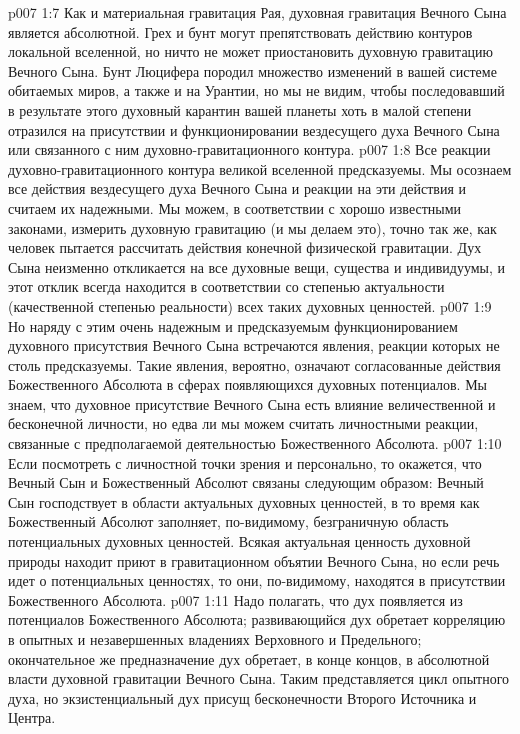 \vs p007 1:7 \pc Как и материальная гравитация Рая, духовная гравитация Вечного Сына является абсолютной. Грех и бунт могут препятствовать действию контуров локальной вселенной, но ничто не может приостановить духовную гравитацию Вечного Сына. Бунт Люцифера породил множество изменений в вашей системе обитаемых миров, а также и на Урантии, но мы не видим, чтобы последовавший в результате этого духовный карантин вашей планеты хоть в малой степени отразился на присутствии и функционировании вездесущего духа Вечного Сына или связанного с ним духовно\hyp{}гравитационного контура.
\vs p007 1:8 \pc Все реакции духовно\hyp{}гравитационного контура великой вселенной предсказуемы. Мы осознаем все действия вездесущего духа Вечного Сына и реакции на эти действия и считаем их надежными. Мы можем, в соответствии с хорошо известными законами, измерить духовную гравитацию (и мы делаем это), точно так же, как человек пытается рассчитать действия конечной физической гравитации. Дух Сына неизменно откликается на все духовные вещи, существа и индивидуумы, и этот отклик всегда находится в соответствии со степенью актуальности (качественной степенью реальности) всех таких духовных ценностей.
\vs p007 1:9 Но наряду с этим очень надежным и предсказуемым функционированием духовного присутствия Вечного Сына встречаются явления, реакции которых не столь предсказуемы. Такие явления, вероятно, означают согласованные действия Божественного Абсолюта в сферах появляющихся духовных потенциалов. Мы знаем, что духовное присутствие Вечного Сына есть влияние величественной и бесконечной личности, но едва ли мы можем считать личностными реакции, связанные с предполагаемой деятельностью Божественного Абсолюта.
\vs p007 1:10 \pc Если посмотреть с личностной точки зрения и персонально, то окажется, что Вечный Сын и Божественный Абсолют связаны следующим образом: Вечный Сын господствует в области актуальных духовных ценностей, в то время как Божественный Абсолют заполняет, по\hyp{}видимому, безграничную область потенциальных духовных ценностей. Всякая актуальная ценность духовной природы находит приют в гравитационном объятии Вечного Сына, но если речь идет о потенциальных ценностях, то они, по\hyp{}видимому, находятся в присутствии Божественного Абсолюта.
\vs p007 1:11 Надо полагать, что дух появляется из потенциалов Божественного Абсолюта; развивающийся дух обретает корреляцию в опытных и незавершенных владениях Верховного и Предельного; окончательное же предназначение дух обретает, в конце концов, в абсолютной власти духовной гравитации Вечного Сына. Таким представляется цикл опытного духа, но экзистенциальный дух присущ бесконечности Второго Источника и Центра.
